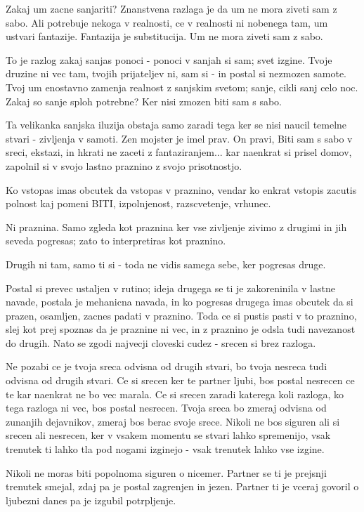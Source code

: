 Zakaj um zacne sanjariti? Znanstvena razlaga je da um ne mora ziveti sam z sabo. Ali potrebuje nekoga v realnosti, ce v realnosti ni nobenega tam, um ustvari fantazije. Fantazija je substitucija. Um ne mora ziveti sam z sabo. 

To je razlog zakaj sanjas ponoci - ponoci v sanjah si sam; svet izgine. Tvoje druzine ni vec tam, tvojih prijateljev ni, sam si - in postal si nezmozen samote. Tvoj um enostavno zamenja realnost z sanjskim svetom; sanje, cikli sanj celo noc. Zakaj so sanje sploh potrebne? Ker nisi zmozen biti sam s sabo. 

Ta velikanka sanjska iluzija obstaja samo zaradi tega ker se nisi naucil temelne stvari - zivljenja v samoti. Zen mojster je imel prav. On pravi,  Biti sam s sabo v sreci, ekstazi, in hkrati ne zaceti z fantaziranjem... kar naenkrat si prisel domov, zapolnil si v svojo lastno praznino z svojo prisotnostjo. 

Ko vstopas imas obcutek da vstopas v praznino, vendar ko enkrat vstopis zacutis polnost kaj pomeni BITI, izpolnjenost, razscvetenje, vrhunec. 

Ni praznina. Samo zgleda kot praznina ker vse zivljenje zivimo z drugimi in jih seveda pogresas; zato to interpretiras kot praznino. 

Drugih ni tam, samo ti si - toda ne vidis samega sebe, ker pogresas druge. 

Postal si prevec ustaljen v rutino; ideja drugega se ti je zakoreninila v lastne navade, postala je mehanicna navada, in ko pogresas drugega imas obcutek da si prazen, osamljen, zacnes padati v praznino. Toda ce si pustis pasti v to praznino, slej kot prej spoznas da je praznine ni vec, in z praznino je odsla tudi navezanost do drugih. Nato se zgodi najvecji cloveski cudez - srecen si brez razloga. 

Ne pozabi ce je tvoja sreca odvisna od drugih stvari, bo tvoja nesreca tudi odvisna od drugih stvari. Ce si srecen ker te partner ljubi, bos postal nesrecen ce te kar naenkrat ne bo vec marala. Ce si srecen zaradi katerega koli razloga, ko tega razloga ni vec, bos postal nesrecen. Tvoja sreca bo zmeraj odvisna od zunanjih dejavnikov, zmeraj bos berac svoje srece. Nikoli ne bos siguren ali si srecen ali nesrecen, ker v vsakem momentu se stvari lahko spremenijo, vsak trenutek ti lahko tla pod nogami izginejo - vsak trenutek lahko vse izgine. 

Nikoli ne moras biti popolnoma siguren o nicemer. Partner se ti je prejsnji trenutek smejal, zdaj pa je postal zagrenjen in jezen. Partner ti je vceraj govoril o ljubezni danes pa je izgubil potrpljenje. 

